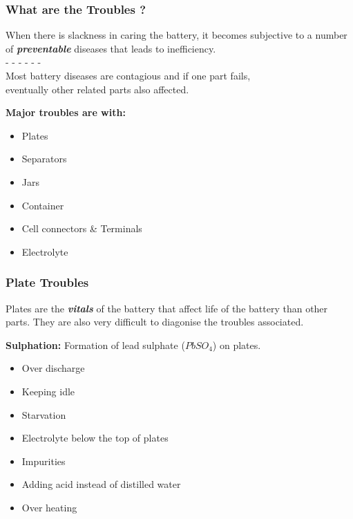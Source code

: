 \documentclass{beamer}
\begin{document}
\begin{frame}     %
  \frametitle{What are the Troubles ?}
  \fontsize{8pt}{14}\selectfont
  \begin{center}
    When there is slackness in caring the battery, it becomes subjective to a number of \textbf{\textit{preventable}} diseases
    that leads to inefficiency. \\
    - - - - - - \\
    Most battery diseases are contagious and if one part fails, \\ eventually other related parts also affected.
  \end{center}
  
  \textbf{Major troubles are with:}
  \begin{itemize}
    \item Plates
    \item Separators
    \item Jars
    \item Container
    \item Cell connectors \& Terminals
    \item Electrolyte
  \end{itemize}
\end{frame}

\begin{frame}     %
  \frametitle{Plate Troubles}
  \fontsize{8pt}{14}\selectfont
  \begin{center}
    Plates are the \textbf{\textit{vitals}} of the battery that affect life of the battery than other parts.
    They are also very difficult to diagonise the troubles associated.
  \end{center}
  
  \textbf{Sulphation:} Formation of lead sulphate ($PbSO_{4}$) on plates.
  \begin{itemize}
    \item Over discharge
    \item Keeping idle
    \item Starvation
    \item Electrolyte below the top of plates
    \item Impurities
    \item Adding acid instead of distilled water
    \item Over heating
  \end{itemize}
\end{frame}
\end{document}
